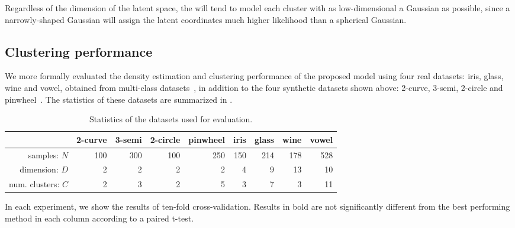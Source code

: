 Regardless of the dimension of the latent space, the \iwmm{} will tend to model each cluster with as low-dimensional a Gaussian as possible, 
since a narrowly-shaped Gaussian will assign the latent coordinates much higher likelihood than a spherical Gaussian.

\subsection{Clustering performance}
We more formally evaluated the density estimation and clustering performance of the proposed model using four real datasets: iris, glass, wine and vowel, obtained from \LIBSVM{} multi-class datasets~\citep{chang2011libsvm}, in addition to the four synthetic datasets shown above: 2-curve, 3-semi, 2-circle and pinwheel~\citep{adams2009archipelago}.
The statistics of these datasets are summarized in .
%
\begin{table}[ht!]
\centering
\caption[Datasets used for evaluation of the \siwmm{}]
{Statistics of the datasets used for evaluation.}
\label{tab:statistics}
\begin{tabular}{rrrrrrrrr}
\hline
 & 2-curve & 3-semi & 2-circle & pinwheel & iris & glass  & wine  & vowel  \\
\hline
samples: $N$ & 100 & 300 & 100 & 250 & 150 & 214 & 178 & 528 \\
dimension: $D$ & 2 & 2 & 2 & 2 & 4 & 9 & 13 & 10 \\
num. clusters: $C$ & 2 & 3 & 2 & 5 & 3 & 7 & 3 & 11 \\
\hline
\end{tabular}
\end{table}
%
In each experiment, we show the results of ten-fold cross-validation.
Results in bold are not significantly different from the best performing method in each column according to a paired t-test.
%
%

